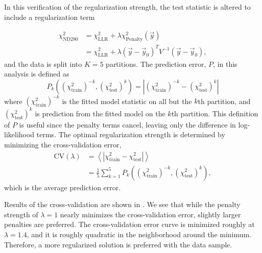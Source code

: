 In this verification of the regularization strength, the test statistic
is altered to include a regularization term

\begin{equation}
\begin{aligned}\chi_{\text{ND280}}^{2} & =\chi_{\text{LLR}}^{2}+\lambda\chi_{\text{Penalty}}^{2}\left(\vec{y}\right)\\
 & =\chi_{\text{LLR}}^{2}+\lambda\left(\vec{y}-\vec{y}_{0}\right)^{T}V^{-1}\left(\vec{y}-\vec{y}_{0}\right),
\end{aligned}
\label{eq:RegularizedDeltaChi2ND280}
\end{equation}
and the data is split into $K=5$ partitions. The prediction error,
$P$, in this analysis is defined as 
\begin{equation}
P_{k}\left(\left(\chi_{\text{train}}^{2}\right)^{-k},\left(\chi_{\text{test}}^{2}\right)^{k}\right)=\left|\left(\chi_{\text{train}}^{2}\right)^{-k}-\left(\chi_{\text{test}}^{2}\right)^{k}\right|\label{eq:predictionerror}
\end{equation}
where $\left(\chi_{\text{train}}^{2}\right)^{-k}$ is the fitted model
statistic on all but the $k$th partition, and $\left(\chi_{\text{test}}^{2}\right)^{k}$
is prediction from the fitted model on the $k$th partition. This
definition of $P$ is useful since the penalty terms cancel, leaving
only the difference in log-likelihood terms. The optimal regularization
strength is determined by minimizing the cross-validation error, 
\begin{equation}
\begin{aligned}\text{CV}\left(\lambda\right) & =\left\langle \left|\chi_{\text{train}}^{2}-\chi_{\text{test}}^{2}\right|\right\rangle \\
 & =\frac{1}{5}\sum_{k=1}^{5}P_{k}\left(\left(\chi_{\text{train}}^{2}\right)^{-k},\left(\chi_{\text{test}}^{2}\right)^{k}\right),
\end{aligned}
\label{eq:CVerror}
\end{equation}
which is the average prediction error.

Results of the cross-validation are shown in .
We see that while the penalty strength of $\lambda=1$ nearly minimizes
the cross-validation error, slightly larger penalties are preferred.
The cross-validation error curve is minimized roughly at $\lambda=1.4$,
and it is roughly quadratic in the neighborhood around the minimum.
Therefore, a more regularized solution is preferred with the data
sample.

